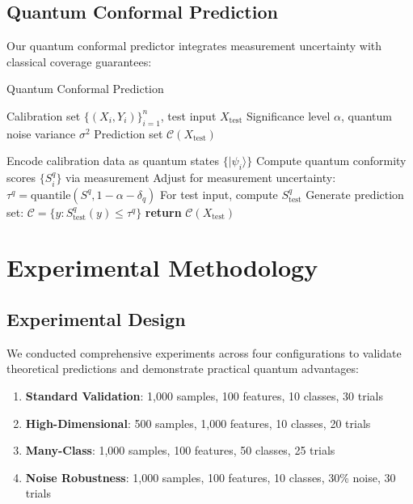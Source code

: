 \documentclass[10pt,twocolumn,letterpaper]{article}
\begin{document}
\subsection{Quantum Conformal Prediction}

Our quantum conformal predictor integrates measurement uncertainty with classical coverage guarantees:

\begin{algorithm}
\caption{Quantum Conformal Prediction}
\label{alg:quantum_conformal}
\begin{algorithmic}[1]
\REQUIRE Calibration set $\{(X_i, Y_i)\}_{i=1}^n$, test input $X_{\text{test}}$
\REQUIRE Significance level $\alpha$, quantum noise variance $\sigma^2$
\ENSURE Prediction set $\mathcal{C}(X_{\text{test}})$

\STATE Encode calibration data as quantum states $\{|\psi_i\rangle\}$
\STATE Compute quantum conformity scores $\{S_i^q\}$ via measurement
\STATE Adjust for measurement uncertainty: $\tau^q = \text{quantile}(S^q, 1-\alpha-\delta_q)$
\STATE For test input, compute $S_{\text{test}}^q$ 
\STATE Generate prediction set: $\mathcal{C} = \{y : S_{\text{test}}^q(y) \leq \tau^q\}$
\STATE \textbf{return} $\mathcal{C}(X_{\text{test}})$
\end{algorithmic}
\end{algorithm}

\section{Experimental Methodology}

\subsection{Experimental Design}

We conducted comprehensive experiments across four configurations to validate theoretical predictions and demonstrate practical quantum advantages:

\begin{enumerate}
\item \textbf{Standard Validation}: 1,000 samples, 100 features, 10 classes, 30 trials
\item \textbf{High-Dimensional}: 500 samples, 1,000 features, 10 classes, 20 trials  
\item \textbf{Many-Class}: 1,000 samples, 100 features, 50 classes, 25 trials
\item \textbf{Noise Robustness}: 1,000 samples, 100 features, 10 classes, 30\% noise, 30 trials
\end{enumerate}
\end{document}

